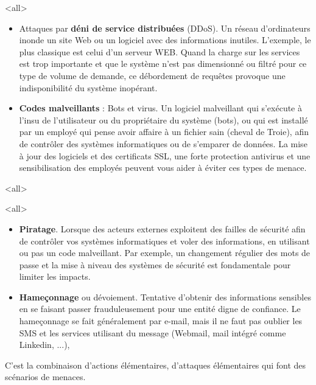 \mode<all>{
{
\begin{itemize}
\item Attaques par \textbf{déni de service distribuées} (DDoS).  Un réseau d’ordinateurs inonde un site Web ou un logiciel avec des informations inutiles. L'exemple, le plus classique est celui d'un serveur WEB. Quand la charge sur les services est trop importante et que le système n'est pas dimensionné ou filtré pour ce type de volume de demande, ce débordement de requêtes provoque une indisponibilité du système inopérant. 
\item \textbf{Codes malveillants} : Bots et virus. Un logiciel malveillant qui s’exécute à l'insu de l'utilisateur ou du propriétaire du système (bots), ou qui est installé par un employé qui pense avoir affaire à un fichier sain (cheval de Troie), afin de contrôler des systèmes informatiques ou de s’emparer de données. La mise à jour des logiciels et des certificats SSL, une forte protection antivirus et une sensibilisation des employés peuvent vous aider à éviter ces types de menace.
\end{itemize}
}}

\mode<all>{}

\mode<all>{
{
\begin{itemize}
\item \textbf{Piratage}. Lorsque des acteurs externes exploitent des failles de sécurité afin de contrôler vos systèmes informatiques et voler des informations, en utilisant ou pas un code malveillant. Par exemple, un changement régulier des mots de passe et la mise à niveau des systèmes de sécurité est fondamentale pour limiter les impacts.
\item \textbf{Hameçonnage} ou dévoiement. Tentative d’obtenir des informations sensibles en se faisant passer frauduleusement pour une entité digne de confiance. Le hameçonnage se fait généralement par e-mail, mais il ne faut pas oublier les SMS et les services utilisant du message (Webmail, mail intégré comme Linkedin, ...), 
\end{itemize}
}}%


C'est la combinaison d'actions élémentaires, d'attaques élémentaires qui font des scénarios de menaces. 


